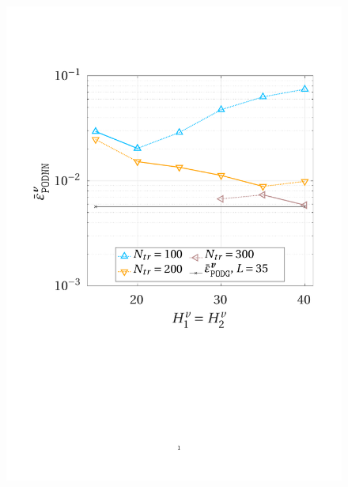 \documentclass{elsarticle}
\numberwithin{equation}{section}
\theoremstyle{theorem}
\theoremstyle{definition}
\theoremstyle{remark}
\theoremstyle{proposition}
\numberwithin{figure}{section}
\begin{document}
\begin{figure}[t]
			\includegraphics[scale = 0.37, trim = {1cm 9cm 1.5cm 3.5cm}, clip]{dc_400_vel_nn_convergence}
			\hspace*{1cm}

\end{figure}
\end{document}
